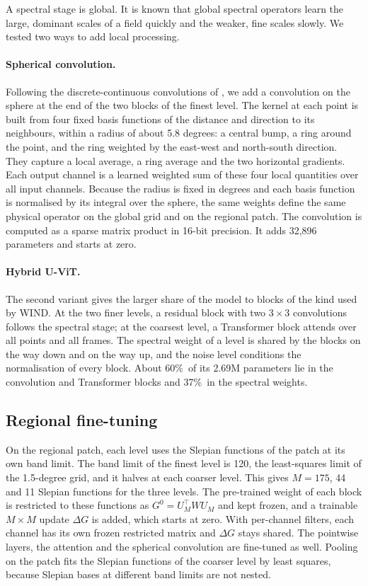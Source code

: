 \documentclass{article}
\newcommand{\pct}{\%\ }
\begin{document}
A spectral stage is global. It is known that global spectral operators learn the large, dominant scales of a field quickly and the weaker, fine scales slowly. We tested two ways to add local processing.

\paragraph{Spherical convolution.}
Following the discrete-continuous convolutions of \citet{ocampo2023disco}, we add a convolution on the sphere at the end of the two blocks of the finest level. The kernel at each point is built from four fixed basis functions of the distance and direction to its neighbours, within a radius of about 5.8 degrees: a central bump, a ring around the point, and the ring weighted by the east-west and north-south direction. They capture a local average, a ring average and the two horizontal gradients. Each output channel is a learned weighted sum of these four local quantities over all input channels. Because the radius is fixed in degrees and each basis function is normalised by its integral over the sphere, the same weights define the same physical operator on the global grid and on the regional patch. The convolution is computed as a sparse matrix product in 16-bit precision. It adds 32,896 parameters and starts at zero.

\paragraph{Hybrid U-ViT.}
The second variant gives the larger share of the model to blocks of the kind used by WIND. At the two finer levels, a residual block with two $3\times3$ convolutions follows the spectral stage; at the coarsest level, a Transformer block attends over all points and all frames. The spectral weight of a level is shared by the blocks on the way down and on the way up, and the noise level conditions the normalisation of every block. About 60\pct of its 2.69M parameters lie in the convolution and Transformer blocks and 37\pct in the spectral weights.

\subsection{Regional fine-tuning}

On the regional patch, each level uses the Slepian functions of the patch at its own band limit. The band limit of the finest level is 120, the least-squares limit of the 1.5-degree grid, and it halves at each coarser level. This gives $M=175$, 44 and 11 Slepian functions for the three levels. The pre-trained weight of each block is restricted to these functions as $G^0=U_M^\top W U_M$ and kept frozen, and a trainable $M\times M$ update $\Delta G$ is added, which starts at zero. With per-channel filters, each channel has its own frozen restricted matrix and $\Delta G$ stays shared. The pointwise layers, the attention and the spherical convolution are fine-tuned as well. Pooling on the patch fits the Slepian functions of the coarser level by least squares, because Slepian bases at different band limits are not nested.
\end{document}
